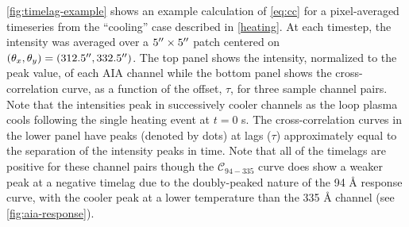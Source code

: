\autoref{fig:timelag-example} shows an example calculation of \autoref{eq:cc} for a pixel-averaged timeseries from the ``cooling'' case described in \autoref{heating}. At each timestep, the intensity was averaged over a $5\mbox{$^{\prime\prime}$}\times5\mbox{$^{\prime\prime}$}$ patch centered on $(\theta_x,\theta_y)=(312.5\mbox{$^{\prime\prime}$},332.5\mbox{$^{\prime\prime}$})$. The top panel shows the intensity, normalized to the peak value, of each AIA channel while the bottom panel shows the cross-correlation curve, as a function of the offset, $\tau$, for three sample channel pairs. Note that the intensities peak in successively cooler channels as the loop plasma cools following the single heating event at $t=0$ s. The cross-correlation curves in the lower panel have peaks (denoted by dots) at lags ($\tau$) approximately equal to the separation of the intensity peaks in time. Note that all of the timelags are positive for these channel pairs though the $\mathcal{C}_{94-335}$ curve does show a weaker peak at a negative timelag due to the doubly-peaked nature of the 94 \AA{} response curve, with the cooler peak at a lower temperature than the 335 \AA{} channel (see \autoref{fig:aia-response}).
